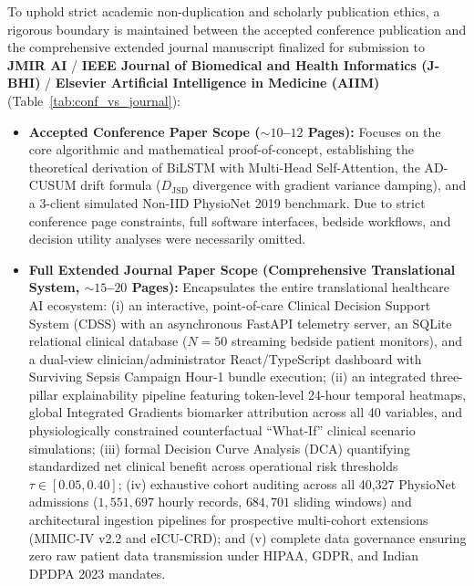 \documentclass[11pt, a4paper]{article}
\begin{document}
To uphold strict academic non-duplication and scholarly publication ethics, a rigorous boundary is maintained between the accepted conference publication and the comprehensive extended journal manuscript finalized for submission to \textbf{JMIR AI} / \textbf{IEEE Journal of Biomedical and Health Informatics (J-BHI)} / \textbf{Elsevier Artificial Intelligence in Medicine (AIIM)} (Table~\ref{tab:conf_vs_journal}):
\begin{itemize}[noitemsep, topsep=1pt]
    \item \textbf{Accepted Conference Paper Scope ($\sim 10$--$12$ Pages):} Focuses on the core algorithmic and mathematical proof-of-concept, establishing the theoretical derivation of BiLSTM with Multi-Head Self-Attention, the AD-CUSUM drift formula ($D_{\text{JSD}}$ divergence with gradient variance damping), and a 3-client simulated Non-IID PhysioNet 2019 benchmark. Due to strict conference page constraints, full software interfaces, bedside workflows, and decision utility analyses were necessarily omitted.
    \item \textbf{Full Extended Journal Paper Scope (Comprehensive Translational System, $\sim 15$--$20$ Pages):} Encapsulates the entire translational healthcare AI ecosystem: (i) an interactive, point-of-care Clinical Decision Support System (CDSS) with an asynchronous FastAPI telemetry server, an SQLite relational clinical database ($N = 50$ streaming bedside patient monitors), and a dual-view clinician/administrator React/TypeScript dashboard with Surviving Sepsis Campaign Hour-1 bundle execution; (ii) an integrated three-pillar explainability pipeline featuring token-level 24-hour temporal heatmaps, global Integrated Gradients biomarker attribution across all 40 variables, and physiologically constrained counterfactual ``What-If'' clinical scenario simulations; (iii) formal Decision Curve Analysis (DCA) quantifying standardized net clinical benefit across operational risk thresholds $\tau \in [0.05, 0.40]$; (iv) exhaustive cohort auditing across all 40,327 PhysioNet admissions ($1,551,697$ hourly records, $684,701$ sliding windows) and architectural ingestion pipelines for prospective multi-cohort extensions (MIMIC-IV v2.2 and eICU-CRD); and (v) complete data governance ensuring zero raw patient data transmission under HIPAA, GDPR, and Indian DPDPA 2023 mandates.
\end{itemize}
\end{document}
